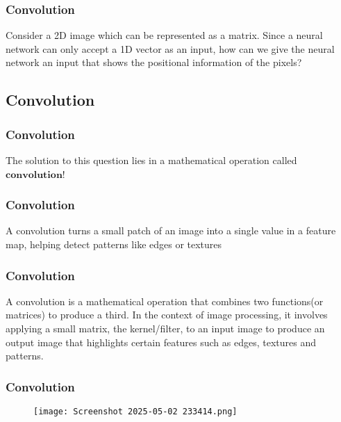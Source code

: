 \documentclass{beamer}
\begin{document}
\begin{frame}
\frametitle{Convolution}
\begin{tcolorbox}
[colback=blue!5!white,colframe=blue!75!black,title= A Simple Question]
Consider a 2D image which can be represented as a matrix. Since a neural network can only accept a 1D vector as an input, how can we give the neural network an input that shows the positional information of the pixels?
\end{tcolorbox}
\end{frame}
\begin{frame}
\section{Convolution}
\frametitle{Convolution}
\begin{tcolorbox}
[colback=blue!5!white,colframe=blue!75!black,title=The Solution]
The solution to this question lies in a mathematical operation called $\textbf{convolution}$!
\end{tcolorbox}
\end{frame}
\begin{frame}
\frametitle{Convolution}
\begin{tcolorbox}
[colback=blue!5!white,colframe=blue!75!black,title=Why Use a Convolution?]
A convolution turns a small patch of an image into a single value in a feature map, helping detect patterns like edges or textures
\end{tcolorbox}
\end{frame}
\begin{frame}
\frametitle{Convolution}
\begin{tcolorbox}
[colback=blue!5!white,colframe=blue!75!black,title=Definition of a Convolution]
A convolution is a mathematical operation that combines two functions(or matrices) to produce a third. In the context of image processing, it involves applying a small matrix, the kernel/filter, to an input image to produce an output image that highlights certain features such as edges, textures and patterns.
\end{tcolorbox}
\end{frame}
\begin{frame}
\frametitle{Convolution}
\begin{tcolorbox}
[colback=blue!5!white,colframe=blue!75!black,title= Visualisation of Convolution]
\begin{figure}
    \centering
    \texttt{[image: Screenshot 2025-05-02 233414.png]}
\end{figure}
\end{tcolorbox}
\end{frame}
\end{document}

